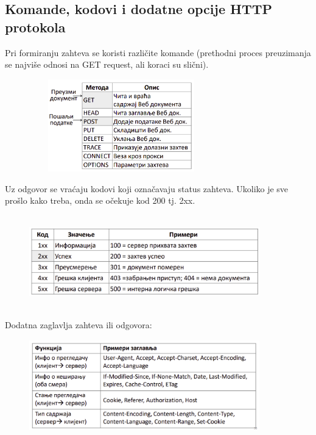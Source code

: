 \documentclass[a4paper]{article}
\begin{document}
    \subsection{Komande, kodovi i dodatne opcije HTTP protokola}
        Pri formiranju zahteva se koristi različite komande (prethodni proces preuzimanja se 
        najviše odnosi na GET request, ali koraci su slični). 
        \begin{figure}[H]
            \begin{center}
                \includegraphics[width=80mm,height=40mm]{Slike/http4.png}
            \end{center}
        \end{figure}
        Uz odgovor se vraćaju kodovi koji označavaju status zahteva. Ukoliko je sve prošlo
        kako treba, onda se očekuje kod 200 tj. 2xx.
        \begin{figure}[H]
            \begin{center}
                \includegraphics[width=100mm,height=40mm]{Slike/http5.png}
            \end{center}
        \end{figure}
        Dodatna zaglavlja zahteva ili odgovora:
        \begin{figure}[H]
            \begin{center}
                \includegraphics[width=100mm,height=40mm]{Slike/http6.png}
            \end{center}
        \end{figure}
\end{document}
